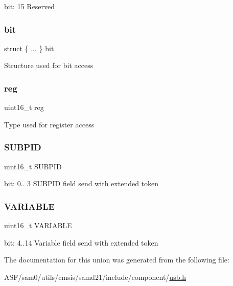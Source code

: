 bit\+: 15 Reserved \mbox{\label{union_u_s_b___h_o_s_t___e_x_t_r_e_g___type_a92698769c2d42fb5decb65725bed0fbd}} 
\subsubsection{\texorpdfstring{bit}{bit}}
{\footnotesize\ttfamily struct \{ ... \}   bit}

Structure used for bit access \mbox{\label{union_u_s_b___h_o_s_t___e_x_t_r_e_g___type_a11760f5020019f4aa8cb02e694f7cc44}} 
\subsubsection{\texorpdfstring{reg}{reg}}
{\footnotesize\ttfamily uint16\+\_\+t reg}

Type used for register access \mbox{\label{union_u_s_b___h_o_s_t___e_x_t_r_e_g___type_afd031d1cb3ff27616a046fd5bc5b8d0c}} 
\subsubsection{\texorpdfstring{SUBPID}{SUBPID}}
{\footnotesize\ttfamily uint16\+\_\+t S\+U\+B\+P\+ID}

bit\+: 0.. 3 S\+U\+B\+P\+ID field send with extended token \mbox{\label{union_u_s_b___h_o_s_t___e_x_t_r_e_g___type_a93176bd4b468edc2704474a2aa255b5f}} 
\subsubsection{\texorpdfstring{VARIABLE}{VARIABLE}}
{\footnotesize\ttfamily uint16\+\_\+t V\+A\+R\+I\+A\+B\+LE}

bit\+: 4..14 Variable field send with extended token 

The documentation for this union was generated from the following file\+:\begin{DoxyCompactItemize}
\item 
A\+S\+F/sam0/utils/cmsis/samd21/include/component/\mbox{\hyperlink{component_2usb_8h}{usb.\+h}}\end{DoxyCompactItemize}
